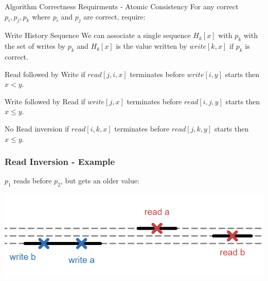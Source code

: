 \begin{frame}{Algorithm Correctness Requirments - Atomic Consistency}
    For any correct $p_i, p_j, p_k$ where $p_i$ and $p_j$ are correct, require:
    \begin{block}{Write History Sequence}
        We can associate a single sequence $H_k[x]$ with $p_k$ with
        the set of writes by $p_k$ and 
        $H_k[x]$ is the value written by $write[k,x]$ if $p_k$ is correct.
    \end{block}
    \pause
    \begin{block}{Read followed by Write}
        if $read[j,i,x]$ terminates before $write[i,y]$ starts then $x<y$.
    \end{block}
    \pause
    \begin{block}{Write followed by Read}
        if $write[j,x]$ terminates before $read[i,j,y]$ starts then $x\leq y$.
    \end{block}
    \pause
    \begin{block}{No Read inversion}
        if $read[i,k,x]$ terminates before $read[j,k,y]$ starts then $x\leq y$.
    \end{block}    
\end{frame}

\begin{frame}
    \frametitle{Read Inversion - Example}
    $p_1$ reads before $p_2$, but gets
    an older value:
    \begin{center}
        \includegraphics[scale=.6]{resources/read_inversion_lines.png}
    \end{center}
\end{frame}

